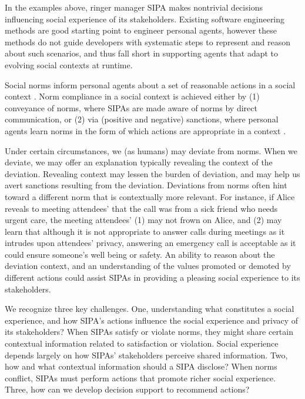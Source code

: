 In the examples above, ringer manager SIPA makes nontrivial decisions
influencing social experience of its stakeholders. Existing software engineering methods
\citep{Bresciani-JAAMAS04-Tropos,Winikoff-2004-DIA,Murukannaiah-AAMAS14-Xipho}
are good starting point to engineer personal agents, however these
methods do not guide developers with systematic steps to represent and
reason about such scenarios, and thus fall short in supporting agents
that adapt to evolving social contexts at runtime.

Social norms inform personal agents about a set of reasonable actions in a social
context \citep{vanRiemsdijk-AAMAS15-SociallyAdaptive}. Norm compliance in
a social context is achieved either by (1) conveyance of norms, where
SIPAs are made aware of norms by direct communication, or (2) via
(positive and negative) sanctions, where personal agents learn norms in the form
of which actions are appropriate in a context
\citep{Andrighetto-2013-PunishVoice}. 

Under certain circumstances, we (as humans) may deviate from norms. When
we deviate, we may offer an explanation typically revealing the context
of the deviation. Revealing context may lessen the burden of deviation,
and may help us avert sanctions resulting from the deviation. Deviations
from norms often hint toward a different norm that is contextually
more relevant. For instance, if Alice reveals to meeting attendees' that the
call was from a sick friend who needs urgent care, the meeting
attendees' (1) may not frown on Alice, and (2) may learn that although
it is not appropriate to answer calls during meetings as it intrudes
upon attendees' privacy, answering an emergency call is acceptable as it
could ensure someone's well being or safety. An ability to reason about
the deviation context, and an understanding of the values promoted or demoted by different
actions could assist SIPAs in providing a pleasing social experience to
its stakeholders.

We recognize three key challenges. One, understanding what constitutes a
social experience, and how SIPA's actions influence the social
experience and privacy of its stakeholders? When SIPAs satisfy or violate
norms, they might share certain contextual information related to
satisfaction or violation. Social experience depends largely on how
SIPAs' stakeholders perceive shared information. Two, how and what
contextual information should a SIPA disclose? When norms conflict,
SIPAs must perform actions that promote richer social experience. Three,
how can we develop decision support to recommend actions?

